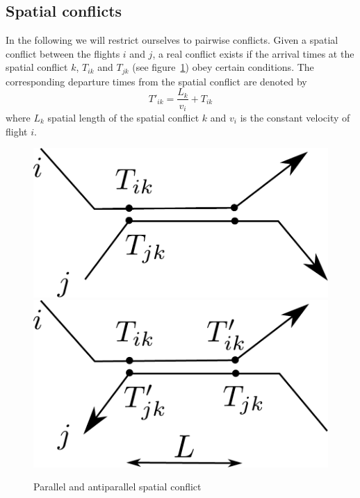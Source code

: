 \documentclass{article}
\begin{document}
\subsection{Spatial conflicts}
In the following we will restrict ourselves to pairwise conflicts.
Given a spatial conflict between the flights $i$ and $j$, a real conflict exists if the arrival times at the spatial conflict $k$, $T_{ik}$ and $T_{jk}$ (see figure~\ref{fig:spatial_conflicts}) obey certain conditions.
The corresponding departure times from the spatial conflict are denoted by 
\begin{equation*}
    T'_{ik} = \frac{L_k}{v_i} + T_{ik}
\end{equation*}
where $L_k$ spatial length of the spatial conflict $k$ and $v_i$ is the constant velocity of flight $i$.
\begin{figure}[htpb]
    \centering
    \includegraphics[width=0.3\linewidth]{pics/spatial_conflict_parallel.pdf}
    \hspace{1cm}
    \includegraphics[width=0.3\linewidth]{pics/spatial_conflict_anti_parallel.pdf}
    \caption{Parallel and antiparallel spatial conflict}
    \label{fig:spatial_conflicts}
\end{figure}
\end{document}
